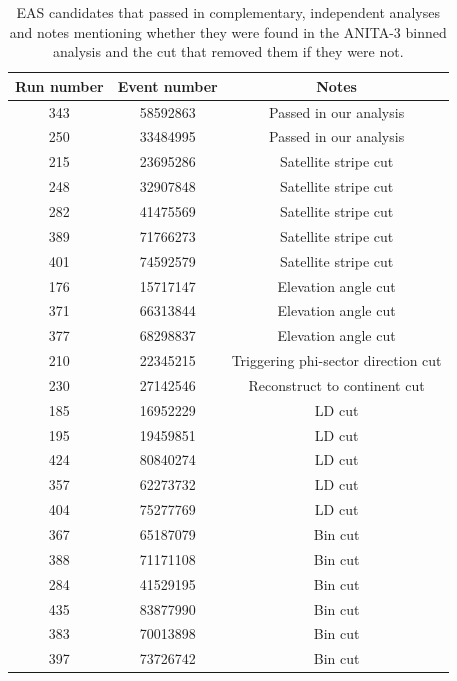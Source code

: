 \begin{table}
\centering
\begin{tabular}{ |c|c|c| } 
 \hline
	Run number & Event number & Notes \\
    \hline
    343	&  58592863  &  {\color{blue} Passed in our analysis}\\
    250	 & 33484995  &  {\color{blue} Passed in our analysis}\\
    215	 & 23695286  &  Satellite stripe cut\\
    248	 & 32907848  &  Satellite stripe cut\\
	282	 & 41475569  &  Satellite stripe cut\\
    389	&  71766273  &  Satellite stripe cut\\
	401	&  74592579  &  Satellite stripe cut\\
	176	 & 15717147  &  Elevation angle cut\\
    371	&  66313844  &  Elevation angle cut\\
	377	&  68298837  &  Elevation angle cut\\
    210	&  22345215  &  Triggering phi-sector direction cut\\
    230	 & 27142546  &  Reconstruct to continent cut\\
	185	 & 16952229  &  LD cut\\
	195	 & 19459851  &  LD cut\\
    424	&  80840274  &  LD cut\\
    357	&  62273732  &  LD cut\\
	404	&  75277769  &  LD cut\\
    367	&  65187079  &  Bin cut\\
	388	&  71171108  &  Bin cut\\
	284	&  41529195  &  Bin cut\\
	435	&  83877990  &  Bin cut\\
	383	&  70013898  &  Bin cut\\
	397	&  73726742  &  Bin cut\\
\hline
\end{tabular}
\caption{EAS candidates that passed in complementary, independent analyses and notes mentioning whether they were found in the ANITA-3 binned analysis and the cut that removed them if they were not.}
\label{othersCRs}
\end{table}


